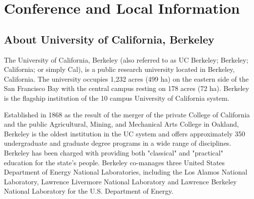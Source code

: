 \chapter{Conference and Local Information}

\setlength\fboxsep{0pt}
\setlength\fboxrule{0.5pt}



 \section{About University of California, Berkeley}

The University of California, Berkeley (also referred to as UC Berkeley; Berkeley; California; or simply Cal), is a public research university located in Berkeley, California. The university occupies 1,232 acres (499 ha) on the eastern side of the San Francisco Bay with the central campus resting on 178 acres (72 ha). Berkeley is the flagship institution of the 10 campus University of California system.

Established in 1868 as the result of the merger of the private College of California and the public Agricultural, Mining, and Mechanical Arts College in Oakland, Berkeley is the oldest institution in the UC system and offers approximately 350 undergraduate and graduate degree programs in a wide range of disciplines. Berkeley has been charged with providing both "classical" and "practical" education for the state's people. Berkeley co-manages three United States Department of Energy National Laboratories, including the Los Alamos National Laboratory, Lawrence Livermore National Laboratory and Lawrence Berkeley National Laboratory for the U.S. Department of Energy.

